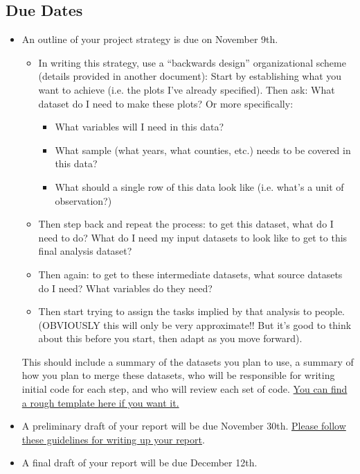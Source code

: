 \documentclass[12pt]{article}
\begin{document}
\subsection*{Due Dates}
\begin{itemize}
  \item An outline of your project strategy is due on November 9th.
  \begin{itemize}
    \item In writing this strategy, use a ``backwards design'' organizational scheme (details provided in another document): Start by establishing what you want to achieve (i.e. the plots I've already specified). Then ask: What dataset do I need to make these plots? Or more specifically:
    \begin{itemize}
      \item What variables will I need in this data?
      \item What sample (what years, what counties, etc.) needs to be covered in this data?
      \item What should a single row of this data look like (i.e. what's a unit of observation?)
    \end{itemize}
    \item Then step back and repeat the process: to get this dataset, what do I need to do? What do I need my input datasets to look like to get to this final analysis dataset?
    \item Then again: to get to these intermediate datasets, what source datasets do I need? What variables do they need?
    \item Then start trying to assign the tasks implied by that analysis to people. (OBVIOUSLY this will only be very approximate!! But it's good to think about this before you start, then adapt as you move forward).
  \end{itemize}
  This should include a summary of the datasets you plan to use, a summary of how you plan to merge these datasets, who will be responsible for writing initial code for each step, and who will review each set of code. \href{https://github.com/nickeubank/practicaldatascience_book/blob/main/ids720_specific/opioids/PracticalDataScience_BackwardsDesignTemplate.pdf}{You can find a rough template here if you want it.}
  \item A preliminary draft of your report will be due November 30th. \href{https://ds4humans.com/40_in_practice/27_data_science_memos.html}{Please follow these guidelines for writing up your report}.
  \item A final draft of your report will be due December 12th.
\end{itemize}
\end{document}
